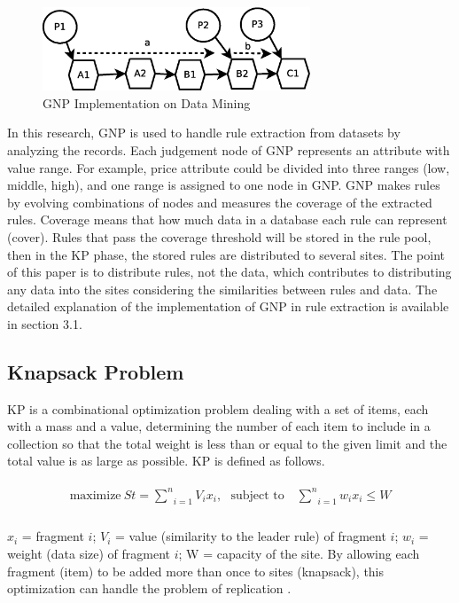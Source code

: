 \documentclass[fleqn,10pt,twocolumn]{SICE14}
\begin{document}
\begin{figure}[tb]
\begin{center}
\includegraphics[width=8cm]{gnpdatamining}
\caption{\label{gnpdatamining} GNP Implementation on Data Mining}
\end{center}
\end{figure}

In this research, GNP is used to handle rule extraction from datasets by analyzing the records. Each judgement node of GNP represents an attribute with value range. For example, price attribute could be divided into three ranges (low, middle, high), and one range is assigned to one node in GNP. GNP makes rules by evolving combinations of nodes and measures the coverage of the extracted rules. Coverage means that how much data in a database each rule can represent (cover). Rules that pass the coverage threshold will be stored in the rule pool, then in the KP phase, the stored rules are distributed to several sites. The point of this paper is to distribute rules, not the data, which contributes to distributing any data into the sites considering the similarities between rules and data. The detailed explanation of the implementation of GNP in rule extraction is available in section 3.1.

\subsection{Knapsack Problem}
KP is a combinational optimization problem dealing with a set of items, each with a mass and a value, determining the number of each item to include in a collection so that the total weight is less than or equal to the given limit and the total value is as large as possible. KP is defined as follows.

\begin{eqnarray}
\begin{array}{lll}
\text{maximize}~St=\underset{i=1}{\overset{n}{\sum}}V_{i}x_{i}, \text{~~subject to~~~} \underset{i=1}{\overset{n}{\sum}}w_{i}x_{i}\leq W \\
\end{array}
\label{eq:ss}
\end{eqnarray}

$x_{i}$ = fragment $i$; $V_{i}$ = value (similarity to the leader rule) of fragment $i$; $w_{i}$ = weight (data size) of fragment $i$; W = capacity of the site.
By allowing each fragment (item) to be added more than once to sites (knapsack), this optimization can handle the problem of replication \cite{knapsack, knapsack2}.
\end{document}
